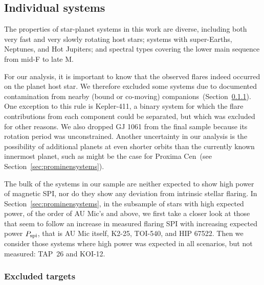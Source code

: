 \documentclass[twocolumn]{aastex631}
\begin{document}
% 


\subsection{Individual systems}
\label{sec:results:individualstars}
The properties of star-planet systems in this work are diverse, including both very fast and very slowly rotating host stars; systems with super-Earths, Neptunes, and Hot Jupiters; and spectral types covering the lower main sequence from mid-F to late M. 

For our analysis, it is important to know that the observed flares indeed occurred on the planet host star. We therefore excluded some systems due to documented contamination from nearby (bound or co-moving) companions~(Section~\ref{sec:results:individualstars:excluded}). One exception to this rule is Kepler-411, a binary system for which the flare contributions from each component could be separated, but which was excluded for other reasons. We also dropped GJ 1061 from the final sample because its rotation period was unconstrained. Another uncertainty in our analysis is the possibility of additional planets at even shorter orbits than the currently known innermost planet, such as might be the case for Proxima Cen~(see Section~\ref{sec:prominensystems}). 

The bulk of the systems in our sample are neither expected to show high power of magnetic SPI, nor do they show any deviation from intrinsic stellar flaring. In Section~\ref{sec:prominensystems}, in the subsample of stars with high expected power, of the order of AU Mic's and above, we first take a closer look at those that seem to follow an increase in measured flaring SPI with increasing expected power $P_{\rm spi}$, that is AU Mic itself, K2-25, TOI-540, and HIP 67522. Then we consider those systems where high power was expected in all scenarios, but not measured: TAP~26 and KOI-12.
\subsubsection{Excluded targets}
\label{sec:results:individualstars:excluded}
\end{document}
